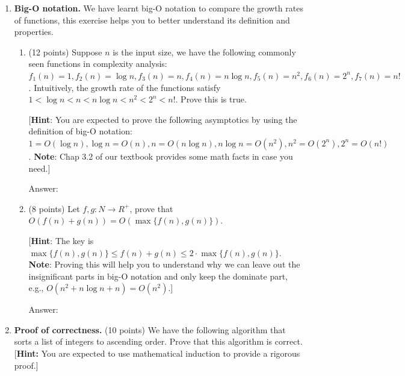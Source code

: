 \documentclass[12pt]{article}
\begin{document}
\begin{enumerate}

  \item \textbf{Big-O notation.} We have learnt big-O notation to compare the growth rates of functions, this exercise helps you to better understand its definition and properties.
  \begin{enumerate}
  	\item (12 points) Suppose $n$ is the input size, we have the following commonly seen functions in complexity analysis: $f_1(n)=1, f_2(n)=\log n, f_3(n)=n, f_4(n)=n\log n, f_5(n)=n^2, f_6(n)=2^n, f_7(n)=n!$. Intuitively, the growth rate of the functions satisfy $1<\log n<n<n\log n<n^2<2^n<n!$. Prove this is true. 
	
	[\textbf{Hint}: You are expected to prove the following asymptotics by using the definition of big-O notation: $1=O(\log n), \log n=O(n), n=O(n\log n), n\log n=O(n^2), n^2=O(2^n), 2^n=O(n!)$. \textbf{Note}: Chap 3.2 of our textbook provides some math facts in case you need.]

	{\color{blue}Answer: }

	\item (8 points) Let $f,g:N\rightarrow R^+$, prove that $O(f(n)+g(n))=O(\max\{f(n),g(n)\})$.
	
	[\textbf{Hint}: The key is $\max\{f(n),g(n)\}\le f(n)+g(n)\le 2\cdot\max\{f(n),g(n)\}$. \textbf{Note}: Proving this will help you to understand why we can leave out the insignificant parts in big-O notation and only keep the dominate part, e.g., $O(n^2+n\log n+n)=O(n^2)$.]
	
	{\color{blue}Answer: }
	
  \end{enumerate}

  \item \textbf{Proof of correctness.} (10 points) We have the following algorithm that sorts a list of integers to ascending order. Prove that this algorithm is correct. [\textbf{Hint:} You are expected to use mathematical induction to provide a rigorous proof.]
    \begin{algorithm}
      \caption{\texttt{Sort a list}}
    \end{algorithm}


\end{enumerate}
\end{document}
